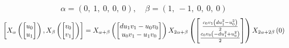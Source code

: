 \documentclass[11pt]{article}
\theoremstyle{definition}
\begin{document}
\[
\alpha = \left( 0, \  1, \  0, \  0, \  0\right), \quad \beta = \left( 1, \  -1, \  0, \  0, \  0\right)
\]
\[
\scaletoalign{\textwidth}{\left[ X_{\alpha}\left(\left[\begin{matrix}u_{0}\\u_{1}\end{matrix}\right]\right), X_{\beta}\left(\left[\begin{matrix}v_{0}\\v_{1}\end{matrix}\right]\right) \right] = X_{\alpha + \beta}\left(\left[\begin{matrix}d u_{1} v_{1} - u_{0} v_{0}\\u_{0} v_{1} - u_{1} v_{0}\end{matrix}\right]\right) X_{2\alpha + \beta}\left(\left[\begin{matrix}\frac{c_{0} v_{1} \left(d u_{1}^{2} - u_{0}^{2}\right)}{2}\\\frac{c_{0} v_{0} \left(- d u_{1}^{2} + u_{0}^{2}\right)}{2}\end{matrix}\right]\right) X_{2\alpha + 2\beta}\left(0\right)}
\]
\end{document}
